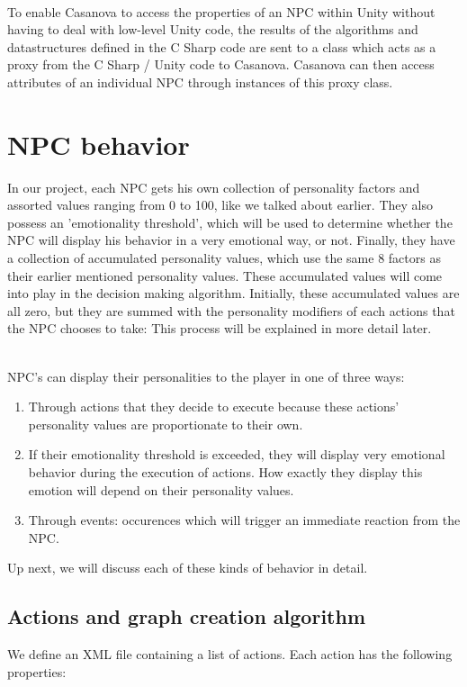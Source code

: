\documentclass[11pt]{article} %
\begin{document}
~\\
To enable Casanova to access the properties of an NPC within Unity without having to deal with low-level Unity code, the results of the  algorithms and datastructures defined in the C Sharp code are sent to a class which acts as a proxy from the C Sharp / Unity code to Casanova. Casanova can then access attributes of an individual NPC through instances of this proxy class.

\newpage
\section{NPC behavior}
In our project, each NPC gets his own collection of personality factors and assorted values ranging from 0 to 100, like we talked about earlier. They also possess an 'emotionality threshold', which will be used to determine whether the NPC will display his behavior in a very emotional way, or not. Finally, they have a collection of accumulated personality values, which use the same 8 factors as their earlier mentioned personality values. These accumulated values will come into play in the decision making algorithm. Initially, these accumulated values are all zero, but they are summed with the personality modifiers of each actions that the NPC chooses to take: This process will be explained in more detail later.

~\\
NPC's can display their personalities to the player in one of three ways:
\begin{enumerate}
\item Through actions that they decide to execute because these actions' personality values are proportionate to their own.
\item If their emotionality threshold is exceeded, they will display very emotional behavior during the execution of actions. How exactly they display this emotion will depend on their personality values.
\item Through events: occurences which will trigger an immediate reaction from the NPC.
\end{enumerate}

Up next, we will discuss each of these kinds of behavior in detail.

\newpage
\subsection{Actions and graph creation algorithm}
We define an XML file containing a list of actions. Each action has the following properties:
\end{document}
